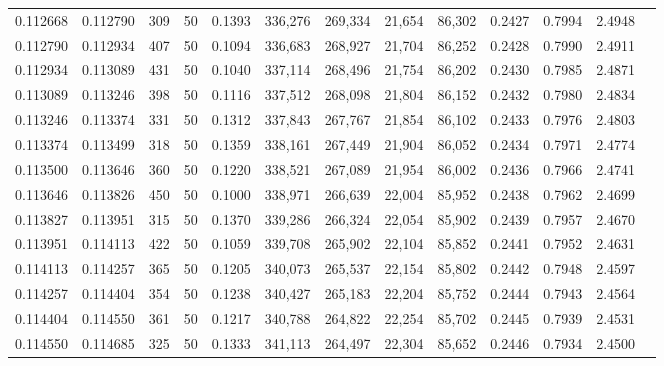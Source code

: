 \begin{tabular}{rrrrrrrrrrrrr}
0.112668 & 0.112790 &   309 &  50 &                                     0.1393 & 336,276 & 269,334 &  21,654 &  86,302 & 0.2427 & 0.7994 & 2.4948 \\
0.112790 & 0.112934 &   407 &  50 &                                     0.1094 & 336,683 & 268,927 &  21,704 &  86,252 & 0.2428 & 0.7990 & 2.4911 \\
0.112934 & 0.113089 &   431 &  50 &                                     0.1040 & 337,114 & 268,496 &  21,754 &  86,202 & 0.2430 & 0.7985 & 2.4871 \\
0.113089 & 0.113246 &   398 &  50 &                                     0.1116 & 337,512 & 268,098 &  21,804 &  86,152 & 0.2432 & 0.7980 & 2.4834 \\
0.113246 & 0.113374 &   331 &  50 &                                     0.1312 & 337,843 & 267,767 &  21,854 &  86,102 & 0.2433 & 0.7976 & 2.4803 \\
0.113374 & 0.113499 &   318 &  50 &                                     0.1359 & 338,161 & 267,449 &  21,904 &  86,052 & 0.2434 & 0.7971 & 2.4774 \\
0.113500 & 0.113646 &   360 &  50 &                                     0.1220 & 338,521 & 267,089 &  21,954 &  86,002 & 0.2436 & 0.7966 & 2.4741 \\
0.113646 & 0.113826 &   450 &  50 &                                     0.1000 & 338,971 & 266,639 &  22,004 &  85,952 & 0.2438 & 0.7962 & 2.4699 \\
0.113827 & 0.113951 &   315 &  50 &                                     0.1370 & 339,286 & 266,324 &  22,054 &  85,902 & 0.2439 & 0.7957 & 2.4670 \\
0.113951 & 0.114113 &   422 &  50 &                                     0.1059 & 339,708 & 265,902 &  22,104 &  85,852 & 0.2441 & 0.7952 & 2.4631 \\
0.114113 & 0.114257 &   365 &  50 &                                     0.1205 & 340,073 & 265,537 &  22,154 &  85,802 & 0.2442 & 0.7948 & 2.4597 \\
0.114257 & 0.114404 &   354 &  50 &                                     0.1238 & 340,427 & 265,183 &  22,204 &  85,752 & 0.2444 & 0.7943 & 2.4564 \\
0.114404 & 0.114550 &   361 &  50 &                                     0.1217 & 340,788 & 264,822 &  22,254 &  85,702 & 0.2445 & 0.7939 & 2.4531 \\
0.114550 & 0.114685 &   325 &  50 &                                     0.1333 & 341,113 & 264,497 &  22,304 &  85,652 & 0.2446 & 0.7934 & 2.4500 \\

\end{tabular}
